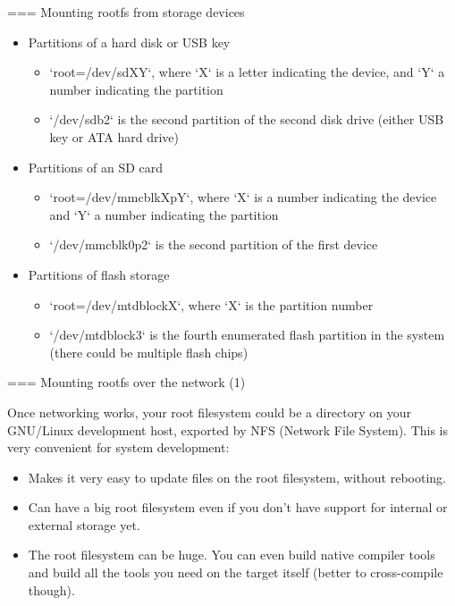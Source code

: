 === Mounting rootfs from storage devices
  \begin{itemize}
  \item Partitions of a hard disk or USB key
    \begin{itemize}
    \item `root=/dev/sdXY`, where `X` is a letter indicating
      the device, and `Y` a number indicating the partition
    \item `/dev/sdb2` is the second partition of the second disk
      drive (either USB key or ATA hard drive)
    \end{itemize}
  \item Partitions of an SD card
    \begin{itemize}
    \item `root=/dev/mmcblkXpY`, where `X` is a number
      indicating the device and `Y` a number indicating the
      partition
    \item `/dev/mmcblk0p2` is the second partition of the first
      device
    \end{itemize}
  \item Partitions of flash storage
    \begin{itemize}
    \item `root=/dev/mtdblockX`, where `X` is the partition number
    \item `/dev/mtdblock3` is the fourth enumerated flash partition in the system
	  (there could be multiple flash chips)
    \end{itemize}
  \end{itemize}


=== Mounting rootfs over the network (1)

  Once networking works, your root filesystem could be a directory on
  your GNU/Linux development host, exported by NFS (Network File
  System). This is very convenient for system development:

  \begin{itemize}
  \item Makes it very easy to update files on the root filesystem,
    without rebooting.
  \item Can have a big root filesystem even if you don't have support
    for internal or external storage yet.
  \item The root filesystem can be huge. You can even build native
    compiler tools and build all the tools you need on the target
    itself (better to cross-compile though).
  \end{itemize}

